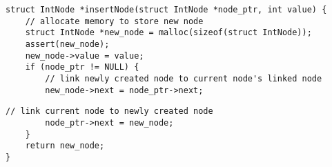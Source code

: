 \documentclass[10pt]{article}
\begin{document}


\small
\begin{tcolorbox}
\begin{lstlisting}[language=ExampleGray]
struct IntNode *insertNode(struct IntNode *node_ptr, int value) {
    // allocate memory to store new node
    struct IntNode *new_node = malloc(sizeof(struct IntNode));  
    assert(new_node);
    new_node->value = value;
    if (node_ptr != NULL) {
        // link newly created node to current node's linked node
        new_node->next = node_ptr->next;
\end{lstlisting}
\vspace*{-\baselineskip}
\begin{lstlisting}[language=Example]
        // link current node to newly created node
        node_ptr->next = new_node;
    }
    return new_node;
}
\end{lstlisting}
\end{tcolorbox}
\end{document}
